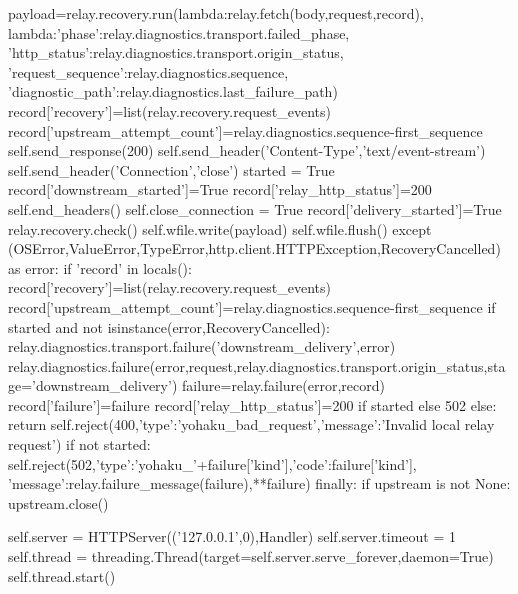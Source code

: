                     payload=relay.recovery.run(lambda:relay.fetch(body,request,record),
                        lambda:{'phase':relay.diagnostics.transport.failed_phase,
                                'http_status':relay.diagnostics.transport.origin_status,
                                'request_sequence':relay.diagnostics.sequence,
                                'diagnostic_path':relay.diagnostics.last_failure_path})
                    record['recovery']=list(relay.recovery.request_events)
                    record['upstream_attempt_count']=relay.diagnostics.sequence-first_sequence
                    self.send_response(200)
                    self.send_header('Content-Type','text/event-stream')
                    self.send_header('Connection','close')
                    started = True
                    record['downstream_started']=True
                    record['relay_http_status']=200
                    self.end_headers()
                    self.close_connection = True
                    record['delivery_started']=True
                    relay.recovery.check()
                    self.wfile.write(payload)
                    self.wfile.flush()
                except (OSError,ValueError,TypeError,http.client.HTTPException,RecoveryCancelled) as error:
                    if 'record' in locals():
                        record['recovery']=list(relay.recovery.request_events)
                        record['upstream_attempt_count']=relay.diagnostics.sequence-first_sequence
                        if started and not isinstance(error,RecoveryCancelled):
                            relay.diagnostics.transport.failure('downstream_delivery',error)
                            relay.diagnostics.failure(error,request,relay.diagnostics.transport.origin_status,stage='downstream_delivery')
                        failure=relay.failure(error,record)
                        record['failure']=failure
                        record['relay_http_status']=200 if started else 502
                    else:
                        return self.reject(400,{'type':'yohaku_bad_request','message':'Invalid local relay request'})
                    if not started:
                        self.reject(502,{'type':'yohaku_'+failure['kind'],'code':failure['kind'],
                            'message':relay.failure_message(failure),**failure})
                finally:
                    if upstream is not None:
                        upstream.close()

        self.server = HTTPServer(('127.0.0.1',0),Handler)
        self.server.timeout = 1
        self.thread = threading.Thread(target=self.server.serve_forever,daemon=True)
        self.thread.start()

